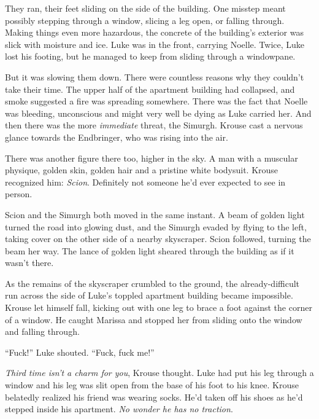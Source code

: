





They ran, their feet sliding on the side of the building.  One misstep meant possibly stepping through a window, slicing a leg open, or falling through.  Making things even more hazardous, the concrete of the building's exterior was slick with moisture and ice.  Luke was in the front, carrying Noelle.  Twice, Luke lost his footing, but he managed to keep from sliding through a windowpane.



But it was slowing them down.  There were countless reasons why they couldn't take their time.  The upper half of the apartment building had collapsed, and smoke suggested a fire was spreading somewhere.  There was the fact that Noelle was bleeding, unconscious and might very well be dying as Luke carried her.  And then there was the more \emph{immediate} threat, the Simurgh.  Krouse cast a nervous glance towards the Endbringer, who was rising into the air.



There was another figure there too, higher in the sky.  A man with a muscular physique, golden skin, golden hair and a pristine white bodysuit.  Krouse recognized him: \emph{Scion}.  Definitely not someone he'd ever expected to see in person.



Scion and the Simurgh both moved in the same instant.  A beam of golden light turned the road into glowing dust, and the Simurgh evaded by flying to the left, taking cover on the other side of a nearby skyscraper.  Scion followed, turning the beam her way.  The lance of golden light sheared through the building as if it wasn't there.



As the remains of the skyscraper crumbled to the ground, the already-difficult run across the side of Luke's toppled apartment building became impossible.  Krouse let himself fall, kicking out with one leg to brace a foot against the corner of a window.  He caught Marissa and stopped her from sliding onto the window and falling through.



``Fuck!''  Luke shouted.  ``Fuck, fuck me!''



\emph{Third time isn't a charm for you}, Krouse thought.  Luke had put his leg through a window and his leg was slit open from the base of his foot to his knee.  Krouse belatedly realized his friend was wearing socks.  He'd taken off his shoes as he'd stepped inside his apartment.  \emph{No wonder he has no traction}.



